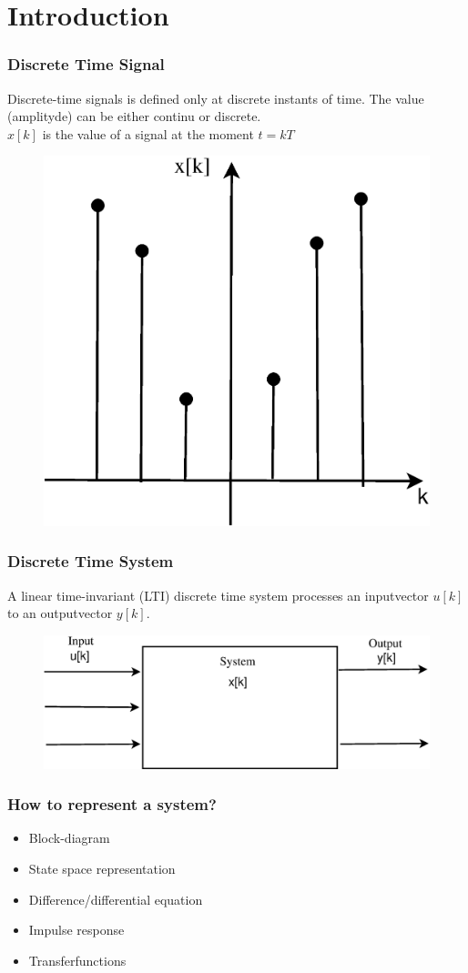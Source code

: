 \section{Introduction}

\def\Z{$\mathbb{Z}$}
\def\R{$\mathbb{R}$}
\begin{frame}
	\frametitle{Discrete Time Signal}
	\begin{definition}
		Discrete-time signals is defined only at discrete instants of time. The value (amplityde) can be either continu or discrete.\\
		$x[k]$ is the value of a signal at the moment $t = kT$
	\end{definition}
	\begin{example}
		\begin{figure}
		\centering
		\includegraphics[width=0.25\linewidth]{Images/Discrete_time_eps_1.eps}
\end{figure}

	\end{example}
\end{frame}
\begin{frame}
	\frametitle{Discrete Time System}
	\begin{definition}
			A linear time-invariant (LTI) discrete time system processes an inputvector $u[k]$ to an outputvector $y[k]$.\\
	\end{definition}
		\begin{example}
			\begin{figure}
				\centering
				\includegraphics[width=0.7\linewidth]{Images/Discrete_time_eps_2.eps}
			\end{figure}
		\end{example}
\end{frame}
\begin{frame}
	\frametitle{How to represent a system?}
	\begin{itemize}
		\item Block-diagram
		\item State space representation
		\item Difference/differential equation
		\item Impulse response
		\item Transferfunctions
	\end{itemize}

\end{frame}
